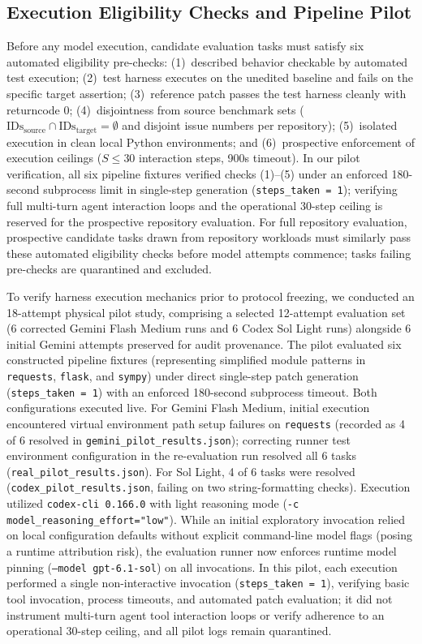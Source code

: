 \documentclass[runningheads]{llncs}
\begin{document}
\subsection{Execution Eligibility Checks and Pipeline Pilot}
Before any model execution, candidate evaluation tasks must satisfy six automated eligibility pre-checks:
(1)~described behavior checkable by automated test execution;
(2)~test harness executes on the unedited baseline and fails on the specific target assertion;
(3)~reference patch passes the test harness cleanly with returncode 0;
(4)~disjointness from source benchmark sets ($\text{IDs}_{\text{source}} \cap \text{IDs}_{\text{target}} = \emptyset$ and disjoint issue numbers per repository);
(5)~isolated execution in clean local Python environments; and
(6)~prospective enforcement of execution ceilings ($S \le 30$ interaction steps, 900s timeout).
In our pilot verification, all six pipeline fixtures verified checks (1)--(5) under an enforced 180-second subprocess limit in single-step generation (\texttt{steps\_taken = 1}); verifying full multi-turn agent interaction loops and the operational 30-step ceiling is reserved for the prospective repository evaluation. For full repository evaluation, prospective candidate tasks drawn from repository workloads must similarly pass these automated eligibility checks before model attempts commence; tasks failing pre-checks are quarantined and excluded.

To verify harness execution mechanics prior to protocol freezing, we conducted an 18-attempt physical pilot study, comprising a selected 12-attempt evaluation set (6 corrected Gemini Flash Medium runs and 6 Codex Sol Light runs) alongside 6 initial Gemini attempts preserved for audit provenance. The pilot evaluated six constructed pipeline fixtures (representing simplified module patterns in \texttt{requests}, \texttt{flask}, and \texttt{sympy}) under direct single-step patch generation (\texttt{steps\_taken = 1}) with an enforced 180-second subprocess timeout. Both configurations executed live. For Gemini Flash Medium, initial execution encountered virtual environment path setup failures on \texttt{requests} (recorded as 4 of 6 resolved in \texttt{gemini\_pilot\_results.json}); correcting runner test environment configuration in the re-evaluation run resolved all 6 tasks (\texttt{real\_pilot\_results.json}). For Sol Light, 4 of 6 tasks were resolved (\texttt{codex\_pilot\_results.json}, failing on two string-formatting checks). Execution utilized \texttt{codex-cli 0.166.0} with light reasoning mode (\texttt{-c model\_reasoning\_effort="low"}). While an initial exploratory invocation relied on local configuration defaults without explicit command-line model flags (posing a runtime attribution risk), the evaluation runner now enforces runtime model pinning (\texttt{--model gpt-6.1-sol}) on all invocations. In this pilot, each execution performed a single non-interactive invocation (\texttt{steps\_taken = 1}), verifying basic tool invocation, process timeouts, and automated patch evaluation; it did not instrument multi-turn agent tool interaction loops or verify adherence to an operational 30-step ceiling, and all pilot logs remain quarantined. 
\end{document}
